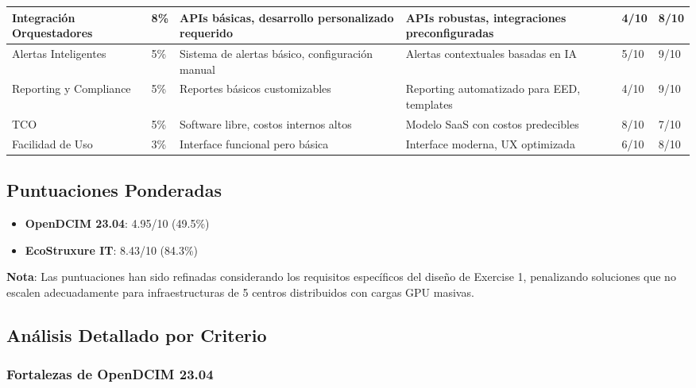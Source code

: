 \documentclass[12pt,a4paper]{article}
\begin{document}
\begin{center}
\begin{longtable}{|p{2.8cm}|p{1.0cm}|p{3.4cm}|p{3.4cm}|p{1.3cm}|p{1.3cm}|}
Integración Orquestadores & 8\% & APIs básicas, desarrollo personalizado requerido & APIs robustas, integraciones preconfiguradas & 4/10 & 8/10 \\
\hline

Alertas Inteligentes & 5\% & Sistema de alertas básico, configuración manual & Alertas contextuales basadas en IA & 5/10 & 9/10 \\
\hline

Reporting y Compliance & 5\% & Reportes básicos customizables & Reporting automatizado para EED, templates & 4/10 & 9/10 \\
\hline

TCO & 5\% & Software libre, costos internos altos & Modelo SaaS con costos predecibles & 8/10 & 7/10 \\
\hline

Facilidad de Uso & 3\% & Interface funcional pero básica & Interface moderna, UX optimizada & 6/10 & 8/10 \\
\hline

\end{longtable}
\end{center}

\subsection{Puntuaciones Ponderadas}

\begin{itemize}
    \item \textbf{OpenDCIM 23.04}: 4.95/10 (49.5\%)
    \item \textbf{EcoStruxure IT}: 8.43/10 (84.3\%)
\end{itemize}

\textbf{Nota}: Las puntuaciones han sido refinadas considerando los requisitos específicos del diseño de Exercise 1, penalizando soluciones que no escalen adecuadamente para infraestructuras de 5 centros distribuidos con cargas GPU masivas.

\subsection{Análisis Detallado por Criterio}

\subsubsection{Fortalezas de OpenDCIM 23.04}
\end{document}
